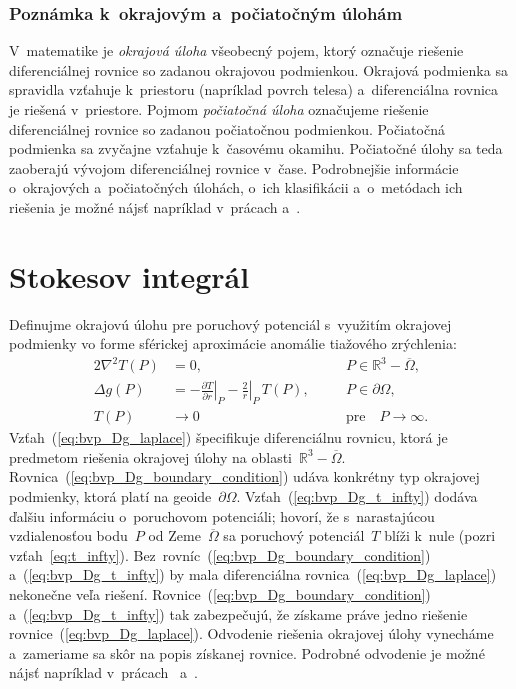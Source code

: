 \documentclass[a4paper, 12pt]{book}
\begin{document}
\subsubsection{Poznámka k~okrajovým a~počiatočným úlohám}

V~matematike je \emph{okrajová úloha} všeobecný pojem, ktorý označuje riešenie 
diferenciálnej rovnice so zadanou okrajovou podmienkou.  Okrajová podmienka sa 
spravidla vzťahuje k~priestoru (napríklad povrch telesa) a~diferenciálna 
rovnica je riešená v~priestore.  Pojmom \emph{počiatočná úloha} označujeme 
riešenie diferenciálnej rovnice so zadanou počiatočnou podmienkou.  Počiatočná 
podmienka sa zvyčajne vzťahuje k~časovému okamihu.  Počiatočné úlohy sa teda 
zaoberajú vývojom diferenciálnej rovnice v~čase.  Podrobnejšie informácie 
o~okrajových a~počiatočných úlohách, o~ich klasifikácii a~o~metódach ich 
riešenia je možné nájsť napríklad v~prácach \textcite{Janak2006} 
a~\textcite{Macak2021}.



\section{Stokesov integrál}
\label{sec:stokes_integral}

Definujme okrajovú úlohu pre poruchový potenciál s~využitím okrajovej podmienky 
vo forme sférickej aproximácie anomálie tiažového zrýchlenia:
%
\begin{alignat}{2}
\nabla^2 T(P) &= 0{,} &&P \in \mathbb{R}^3 
- \overline\Omega{,}\label{eq:bvp_Dg_laplace}\\
\Delta g(P) &= -\left.\frac{\partial T}{\partial r}\right|_P 
- \left.\frac{2}{r}\right|_P \, T(P){,} \quad &&P \in 
\partial\Omega{,}\label{eq:bvp_Dg_boundary_condition}\\
T(P) &\rightarrow 0 &&\textrm{pre} \quad P \rightarrow 
\infty{.}\label{eq:bvp_Dg_t_infty}
\end{alignat}
%
Vzťah~(\ref{eq:bvp_Dg_laplace}) špecifikuje diferenciálnu rovnicu, ktorá je 
predmetom riešenia okrajovej úlohy na oblasti~$\mathbb{R}^3 - \overline\Omega$.  
Rovnica~(\ref{eq:bvp_Dg_boundary_condition}) udáva konkrétny typ okrajovej 
podmienky, ktorá platí na geoide~$\partial\Omega$.  
Vzťah~(\ref{eq:bvp_Dg_t_infty}) dodáva ďalšiu informáciu o~poruchovom 
potenciáli; hovorí, že s~narastajúcou vzdialenosťou bodu~$P$ od 
Zeme~$\overline\Omega$ sa poruchový potenciál~$T$ blíži k~nule (pozri 
vzťah~\ref{eq:t_infty}).  Bez~rovníc~(\ref{eq:bvp_Dg_boundary_condition}) 
a~(\ref{eq:bvp_Dg_t_infty}) by mala diferenciálna 
rovnica~(\ref{eq:bvp_Dg_laplace}) nekonečne veľa riešení.  
Rovnice~(\ref{eq:bvp_Dg_boundary_condition}) a~(\ref{eq:bvp_Dg_t_infty}) tak 
zabezpečujú, že získame práve jedno riešenie rovnice~(\ref{eq:bvp_Dg_laplace}).  
Odvodenie riešenia okrajovej úlohy vynecháme a~zameriame sa skôr na popis 
získanej rovnice.  Podrobné odvodenie je možné nájsť napríklad 
v~prácach~\textcite{MoritzPhysicalGeodesy} a~\textcite{Janak2006}.
\end{document}
